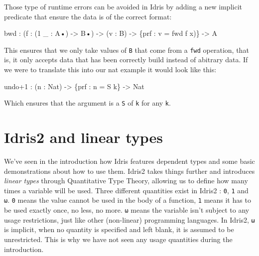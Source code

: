 \documentclass[
]{article}
\newenvironment{Shaded}{}{}
\newcommand{\DataTypeTok}[1]{\textcolor[rgb]{0.56,0.13,0.00}{#1}}
\newcommand{\DecValTok}[1]{\textcolor[rgb]{0.25,0.63,0.44}{#1}}
\newcommand{\NormalTok}[1]{#1}
\newcommand{\OperatorTok}[1]{\textcolor[rgb]{0.40,0.40,0.40}{#1}}
\newcommand{\OtherTok}[1]{\textcolor[rgb]{0.00,0.44,0.13}{#1}}
\begin{document}
Those type of runtime errors can be avoided in Idris by adding a new
implicit predicate that ensure the data is of the correct format:

\begin{Shaded}
\begin{Highlighting}[]
\NormalTok{bwd }\OperatorTok{:}\NormalTok{ (f }\OperatorTok{:}\NormalTok{ (}\DecValTok{1}\NormalTok{ \_ }\OperatorTok{:} \DataTypeTok{A}\NormalTok{•) }\OtherTok{{-}\textgreater{}} \DataTypeTok{B}\NormalTok{•) }\OtherTok{{-}\textgreater{}}\NormalTok{ (v }\OperatorTok{:} \DataTypeTok{B}\NormalTok{) }\OtherTok{{-}\textgreater{}}\NormalTok{ \{prf }\OperatorTok{:}\NormalTok{ v }\OtherTok{=}\NormalTok{ fwd f x)\} }\OtherTok{{-}\textgreater{}} \DataTypeTok{A}
\end{Highlighting}
\end{Shaded}

This ensures that we only take values of \texttt{B} that come from a
\texttt{fwd} operation, that is, it only accepts data that has been
correctly build instead of abitrary data. If we were to translate this
into our nat example it would look like this:

\begin{Shaded}
\begin{Highlighting}[]
\NormalTok{undo}\OperatorTok{+}\DecValTok{1} \OperatorTok{:}\NormalTok{ (n }\OperatorTok{:} \DataTypeTok{Nat}\NormalTok{) }\OtherTok{{-}\textgreater{}}\NormalTok{ \{prf }\OperatorTok{:}\NormalTok{ n }\OtherTok{=} \DataTypeTok{S}\NormalTok{ k\} }\OtherTok{{-}\textgreater{}} \DataTypeTok{Nat}
\end{Highlighting}
\end{Shaded}

Which ensures that the argument is a \texttt{S} of \texttt{k} for any
\texttt{k}.

\newpage

\hypertarget{idris2-and-linear-types}{%
\section{Idris2 and linear types}\label{idris2-and-linear-types}}

We've seen in the introduction how Idris features dependent types and
some basic demonstrations about how to use them. Idris2 takes things
further and introduces \emph{linear types} through Quantitative Type
Theory, allowing us to define how many times a variable will be used.
Three different quantities exist in Idris2 : \texttt{0}, \texttt{1} and
\texttt{ω}. \texttt{0} means the value cannot be used in the body of a
function, \texttt{1} means it has to be used exactly once, no less, no
more. \texttt{ω} means the variable isn't subject to any usage
restrictions, just like other (non-linear) programming languages. In
Idris2, \texttt{ω} is implicit, when no quantity is specified and left
blank, it is assumed to be unrestricted. This is why we have not seen
any usage quantities during the introduction.
\end{document}
